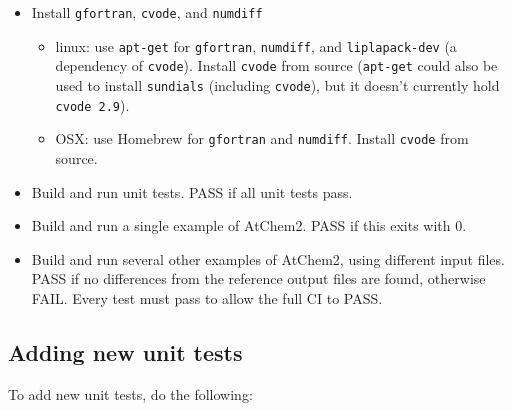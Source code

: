 \begin{itemize}
\item Install \texttt{gfortran}, \texttt{cvode}, and \texttt{numdiff}
  \begin{itemize}
  \item linux: use \texttt{apt-get} for \texttt{gfortran},
    \texttt{numdiff}, and \texttt{liplapack-dev} (a dependency of
    \texttt{cvode}). Install \texttt{cvode} from source
    (\texttt{apt-get} could also be used to install \texttt{sundials}
    (including \texttt{cvode}), but it doesn't currently hold
    \texttt{cvode\ 2.9}).
  \item OSX: use Homebrew for \texttt{gfortran} and
    \texttt{numdiff}. Install \texttt{cvode} from source.
  \end{itemize}
\item Build and run unit tests. PASS if all unit tests pass.
\item Build and run a single example of AtChem2. PASS if this exits
  with 0.
\item Build and run several other examples of AtChem2, using different
  input files. PASS if no differences from the reference output files
  are found, otherwise FAIL. Every test must pass to allow the full CI
  to PASS.
\end{itemize}

\subsection{Adding new unit tests} \label{subsec:adding-new-unit-tests}

To add new unit tests, do the following:

